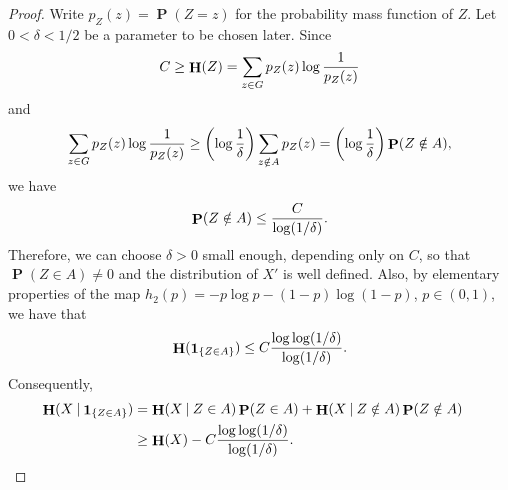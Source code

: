 \documentclass[10pt,a4paper]{amsart}
\DeclareMathOperator{\Eta}{\mathbf{H}}
\newcommand\given{\mathbin{|}}
\newcommand{\one}{\mathop{\mathbf{1}}\nolimits}
\DeclareMathOperator{\pr}{\mathbf{P}}
\begin{document}
\begin{proof}
Write $p_Z(z) = \pr(Z=z)$ for the probability
mass function of $Z$.
Let $0<\delta<1/2$ be a parameter to be chosen later. Since
$$C \geq \Eta(Z) = \sum_{z\in G} p_Z(z) \log{1\over p_Z(z)}$$
and
$$\sum_{z\in G} p_Z(z) \log{1\over p_Z(z)} \ge \biggl(\log{1\over \delta}\biggr)\sum_{z\notin A} p_Z(z) = \biggl(\log{1\over\delta}\biggr)\pr(Z\notin A),$$
we have
\begin{equation}\begin{aligned}\label{eqCoverlog}
\pr(Z\notin A) \le {C\over \log(1/\delta)}.
\end{aligned}\end{equation}
Therefore, we can choose $\delta>0$ small enough,
depending only on $C$,
so that $\pr(Z\in A)\neq 0$ and the distribution 
of $X'$ is well defined. Also,
by elementary properties of the map
$h_2(p)= - p\log p - (1-p)\log(1-p)$, 
$p\in(0,1)$, we have that
$$\Eta(\one_{\{Z\in A\}}) \le C{\log\log(1/\delta)\over \log(1/\delta)}.$$
Consequently,
\begin{equation}\begin{aligned}\label{eqloglogoverlog}
\Eta(X\given \one_{\{Z\in A\}})
&= \Eta(X\given Z\in A)\pr(Z\in A) + 
\Eta(X\given Z\notin A)\pr(Z\notin A) \cr
&\ge \Eta (X) - C{\log\log(1/\delta)\over \log(1/\delta)}.
\end{aligned}\end{equation}


\end{proof}
\end{document}
